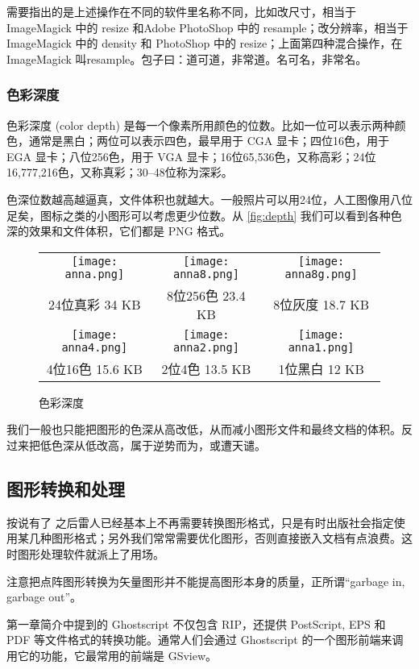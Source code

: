 需要指出的是上述操作在不同的软件里名称不同，比如改尺寸，相当于 ImageMagick 中的 resize 和Adobe PhotoShop 中的 resample；改分辨率，相当于 ImageMagick 中的 density 和 PhotoShop 中的 resize；上面第四种混合操作，在 ImageMagick 叫resample。包子曰：道可道，非常道。名可名，非常名。

\subsubsection{色彩深度}

色彩深度 (color depth) 是每一个像素所用颜色的位数。比如一位可以表示两种颜色，通常是黑白；两位可以表示四色，最早用于 CGA 显卡；四位16色，用于 EGA 显卡；八位256色，用于 VGA 显卡；16位65,536色，又称高彩；24位16,777,216色，又称真彩；30--48位称为深彩。

色深位数越高越逼真，文件体积也就越大。一般照片可以用24位，人工图像用八位足矣，图标之类的小图形可以考虑更少位数。从 \autoref{fig:depth} 我们可以看到各种色深的效果和文件体积，它们都是 PNG 格式。

\begin{figure}[htbp]
\centering
\begin{tabular}{ccc}
  \texttt{[image: anna.png]} & \texttt{[image: anna8.png]} & \texttt{[image: anna8g.png]} \\
  24位真彩 34 KB & 8位256色 23.4 KB & 8位灰度 18.7 KB \\
  \texttt{[image: anna4.png]} & \texttt{[image: anna2.png]} & \texttt{[image: anna1.png]} \rule{0pt}{111pt} \\
  4位16色 15.6 KB & 2位4色 13.5 KB & 1位黑白 12 KB
\end{tabular}
\caption{色彩深度}
\label{fig:depth}
\end{figure}

我们一般也只能把图形的色深从高改低，从而减小图形文件和最终文档的体积。反过来把低色深从低改高，属于逆势而为，或遭天谴。

\subsection{图形转换和处理}

按说有了 \XeLaTeX 之后雷人已经基本上不再需要转换图形格式，只是有时出版社会指定使用某几种图形格式；另外我们常常需要优化图形，否则直接嵌入文档有点浪费。这时图形处理软件就派上了用场。

注意把点阵图形转换为矢量图形并不能提高图形本身的质量，正所谓“garbage in, garbage out”。

第一章简介中提到的 Ghostscript 不仅包含 RIP，还提供 PostScript, EPS 和 PDF 等文件格式的转换功能。通常人们会通过 Ghostscript 的一个图形前端来调用它的功能，它最常用的前端是 GSview。

